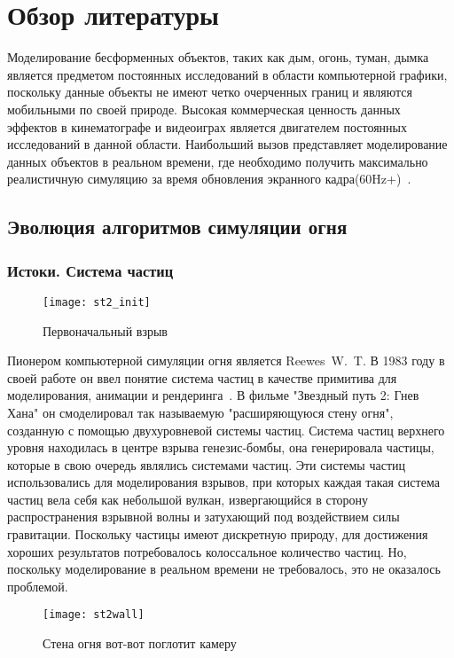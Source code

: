 \section{Обзор литературы}
\label{sec:lit_review}

Моделирование бесформенных объектов, таких как дым, огонь, туман, дымка является
предметом постоянных исследований в области компьютерной графики, поскольку
данные объекты не имеют четко очерченных границ и являются мобильными по своей
природе. Высокая коммерческая ценность данных эффектов в кинематографе и
видеоиграх является двигателем постоянных исследований в данной области.
Наибольший вызов представляет моделирование данных объектов в реальном времени,
где необходимо получить максимально реалистичную симуляцию за время обновления
экранного кадра(60Hz+)~\cite{lec17}.

\subsection{Эволюция алгоритмов симуляции огня}
\subsubsection{Истоки. Система частиц}
\begin{figure}[htb]
	\centering
	\texttt{[image: st2\_init]}
	\caption{Первоначальный взрыв}
\end{figure}
Пионером компьютерной симуляции огня является Reewes~W.~T. В 1983 году в своей
работе он ввел понятие система частиц в качестве примитива для моделирования,
анимации и рендеринга~\cite{reewes1983}. В фильме "Звездный путь 2: Гнев Хана"
он смоделировал так называемую "расширяющуюся стену огня", созданную с помощью
двухуровневой системы частиц. Система частиц верхнего уровня находилась в центре
взрыва генезис-бомбы, она генерировала частицы, которые в свою очередь являлись
системами частиц. Эти системы частиц использовались для моделирования взрывов,
при которых каждая такая система частиц вела себя как небольшой вулкан,
извергающийся в сторону распространения взрывной волны и затухающий под
воздействием силы гравитации. Поскольку частицы имеют дискретную природу, для
достижения хороших результатов потребовалось колоссальное количество частиц. Но,
поскольку моделирование в реальном времени не требовалось, это не оказалось
проблемой.
\begin{figure}[htb]
	\centering
	\texttt{[image: st2wall]}
	\caption{Стена огня вот-вот поглотит камеру}
\end{figure}

